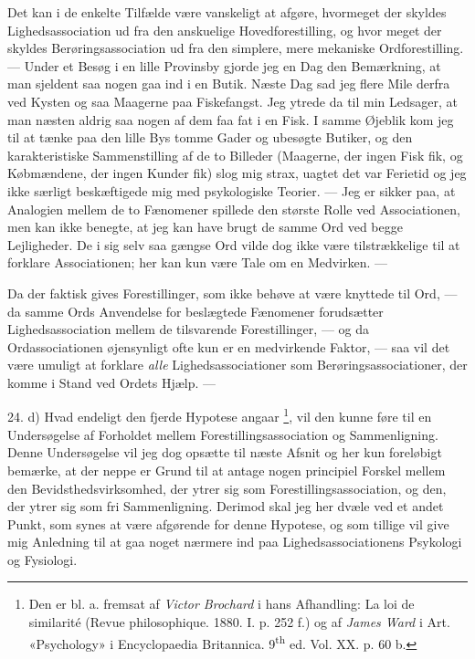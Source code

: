 \documentclass[12pt,a4paper,openany]{book}
\newcommand{\opage}[1]{\marginnote{\footnotesize\textit{[#1]}}}
\begin{document}
Det kan i de enkelte Tilfælde være vanskeligt at afgøre, hvormeget der skyldes
Lighedsassociation ud fra den anskuelige Hovedforestilling, og hvor meget der skyldes
\setcounter{footnote}{0}%
\opage{52}Berøringsassociation ud fra den simplere, mere mekaniske
Ordforestilling. --- Under et Besøg i en lille Provinsby gjorde jeg en Dag den
Bemærkning, at man sjeldent saa nogen gaa ind i en Butik. Næste Dag sad jeg
flere Mile derfra ved Kysten og saa Maagerne paa Fiskefangst. Jeg ytrede da til
min Ledsager, at man næsten aldrig saa nogen af dem faa fat i en Fisk. I samme
Øjeblik kom jeg til at tænke paa den lille Bys tomme Gader og ubesøgte Butiker,
og den karakteristiske Sammenstilling af de to Billeder (Maagerne, der ingen
Fisk fik, og Købmændene, der ingen Kunder fik) slog mig strax, uagtet det var
Ferietid og jeg ikke særligt beskæftigede mig med psykologiske Teorier. --- Jeg
er sikker paa, at Analogien mellem de to Fænomener spillede den største Rolle
ved Associationen, men kan ikke benegte, at jeg kan have brugt de samme Ord ved
begge Lejligheder. De i sig selv saa gængse Ord vilde dog ikke være
tilstrækkelige til at forklare Associationen; her kan kun være Tale om en
Medvirken. ---

Da der faktisk gives Forestillinger, som ikke behøve at være knyttede til Ord,
--- da samme Ords Anvendelse for beslægtede Fænomener forudsætter
Lighedsassociation mellem de tilsvarende Forestillinger, --- og da
Ordassociationen øjensynligt ofte kun er en medvirkende Faktor, --- saa vil det
være umuligt at forklare \emph{alle} Lighedsassociationer som
Berøringsassociationer, der komme i Stand ved Ordets Hjælp. ---

24. d) Hvad endeligt den fjerde Hypotese angaar%
\footnote[1]{Den er bl. a. fremsat af \emph{Victor Brochard} i hans Afhandling:
La loi de similarité (Revue philosophique. 1880. I. p. 252 f.) og af
\emph{James Ward} i Art. «Psychology» i Encyclopaedia Britannica.
9\textsuperscript{th} ed. Vol. XX. p. 60 b.}, vil den kunne føre til en
Undersøgelse af Forholdet mellem Forestillingsassociation og Sammenligning.
Denne Undersøgelse vil jeg dog opsætte til næste Afsnit og her kun foreløbigt
bemærke, at der neppe er Grund til at antage nogen principiel Forskel mellem
den Bevidsthedsvirksomhed, der ytrer sig som Forestillingsassociation, og den,
der ytrer sig som fri Sammenligning. Derimod skal jeg her dvæle ved et andet
Punkt, som synes at være afgørende for denne Hypotese, og som tillige vil give
mig Anledning til at gaa noget nærmere ind paa Lighedsassociationens Psykologi
og Fysiologi.
\end{document}
